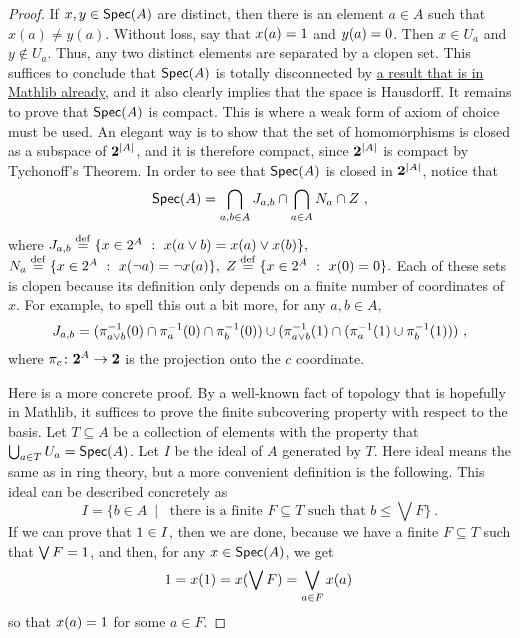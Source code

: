 \documentclass[a4paper]{article}
\begin{document}
\begin{proof}
    If $x, y \in \operatorname*{\mathsf{Spec}}(A)$ are distinct, then there is an element $a \in A$
    such that $x(a) \neq y(a)$. Without loss, say that $x(a) = 1$ and $y(a)
    = 0$. Then $x \in U_a$ and $y \not\in U_a$. Thus, any two distinct
    elements are separated by a clopen set. This suffices to conclude that
    $\operatorname*{\mathsf{Spec}}(A)$ is totally disconnected by
    \href{https://leanprover-community.github.io/mathlib4_docs/Mathlib/Topology/Connected/TotallyDisconnected.html#isTotallyDisconnected_of_isClopen_set}{
    a result that is in Mathlib already}, and it also clearly implies that the
    space is Hausdorff. It remains to prove that $\operatorname*{\mathsf{Spec}}(A)$ is compact. This is
    where a weak form of axiom of choice must be used. An elegant way 
    is to show that the set of homomorphisms
    is closed as a subspace of $\mathbf{2}^{|A|}$, and it is therefore compact,
    since $\mathbf{2}^{|A|}$ is compact by Tychonoff's Theorem. In order to see
    that $\operatorname*{\mathsf{Spec}}(A)$ is closed in $\mathbf{2}^{|A|}$, notice that
    \[ \operatorname*{\mathsf{Spec}}(A) = \bigcap_{a,b\in A} J_{a,b} \cap \bigcap_{a \in A} N_a \cap Z
    \ , \]
    where $J_{a,b} \stackrel{\mathrm{def}}{=} \{ x \in 2^A \ : \ x(a \vee b) = x(a) \vee x(b) \},$
    $N_a \stackrel{\mathrm{def}}{=}  \{x \in 2^A \ : \ x(\neg a) = \neg x(a) \},$ $Z \stackrel{\mathrm{def}}{=} \{ x
    \in 2^A \ : \ x(0) = 0\}.$ Each of these sets is clopen because its
    definition only depends on a finite number of coordinates of $x$. For example, to
    spell this out a bit more,
    for any $a, b \in A$,
    \[ J_{a,b} = 
        (\pi_{a \vee b}^{-1}(0) \cap \pi_{a}^{-1}(0) \cap
        \pi_{b}^{-1}(0)) \cup (\pi_{a \vee b}^{-1}(1) \cap
    (\pi_a^{-1}(1) \cup \pi_b^{-1}(1))) \ , \]
    where $\pi_c \colon \mathbf{2}^A \to \mathbf{2}$ is the projection onto the $c$
    coordinate.



    Here is a more concrete proof. By a well-known fact of topology that is
    hopefully in Mathlib, it suffices to prove the finite subcovering property
    with respect to the basis.  Let $T \subseteq A$ be a collection of elements
    with the property that $\bigcup_{a \in T} U_a = \operatorname*{\mathsf{Spec}}(A)$. Let $I$ be the
    ideal of $A$ generated by $T$. Here ideal means the same as in ring theory,
    but a more convenient definition is the following. This ideal can be
    described concretely as $$I = \{ b \in A \ \mid \ \text{ there is a finite
    } F \subseteq T \text{ such that } b \leq \bigvee F\}\ . $$ If we can prove
    that $1 \in I$, then we are done, because we have a finite $F \subseteq
    T$ such that $\bigvee F = 1$, and then, for any $x \in \operatorname*{\mathsf{Spec}}(A)$, we get
    \[ 1 = x(1) = x(\bigvee F) = \bigvee_{a \in F} x(a) \, \] so that
    $x(a) = 1$ for some $a \in F$.


\end{proof}
\end{document}
